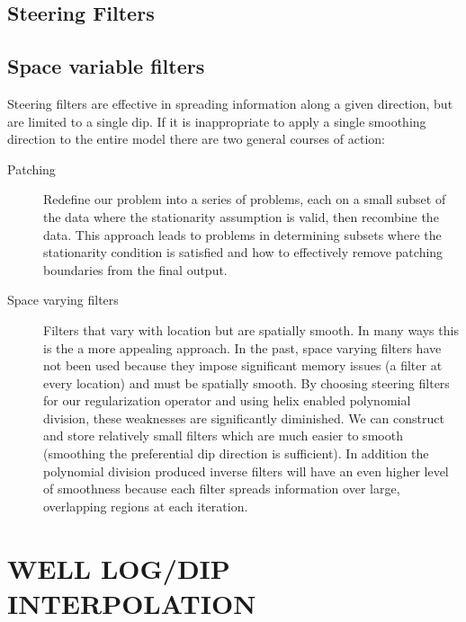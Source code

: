 \subsection{Steering Filters}
 

\subsection{Space variable filters}
Steering filters are effective in spreading information
along a given direction, but are limited to a single dip.
If it is inappropriate to apply a single smoothing direction to
the entire
model 
there are two general
courses of action:
\begin{description}
\item [Patching] \cite{Claerbout.sep.73.391,Schwab.sep.84.271}
Redefine our problem into a series of problems,
each on a small subset of the data where the stationarity assumption is
valid, then recombine the data.  This approach leads to problems in determining
                 subsets where the stationarity condition is satisfied
    and how to effectively remove patching boundaries from the final output.
\item [Space varying filters] Filters that vary with location
but are spatially smooth. In many ways this is the a more appealing
approach.
In the past, space varying filters have not been used because they
impose significant memory issues (a filter at every location) and must
be spatially smooth.
By choosing steering filters for our regularization operator and using
helix enabled polynomial division, these 
weaknesses are significantly diminished.  
We can construct and store relatively
small filters which are much easier to smooth  (smoothing the preferential
dip direction is sufficient).
In addition the polynomial division produced inverse
filters will have an even higher level of smoothness because 
each filter spreads
information over large, overlapping regions at each iteration.
\end{description}

\section{WELL LOG/DIP INTERPOLATION}

